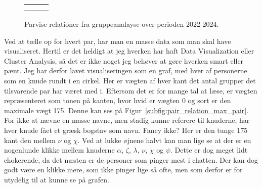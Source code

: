 \begin{article}
\begin{figure*}[t!]
	\centering
	\begin{tabularx}{2\columnwidth}{MMM}
		\resizebox{.60\columnwidth}{!}{}
		&
		\resizebox{.60\columnwidth}{!}{}
		&
		\resizebox{.60\columnwidth}{!}{}
		\\
		\label{subfig:pair_relation_max_pair}
		&
		\label{subfig:pair_relation_group_count}
		&
		\label{subfig:pair_relation_max_group_count}
	\end{tabularx}
	\vspace{-20pt}
	\caption{Parvise relationer fra gruppeanalayse over perioden 2022-2024.}
	\label{fig:pair_relation}
\end{figure*}

Ved at tælle op for hvert par, har man en masse data som man skal have visualiseret. Hertil er det heldigt at jeg hverken har haft Data Visualization eller Cluster Analysis, så det er ikke noget jeg behøver at gøre hverken smart eller pænt. Jeg har derfor lavet visualiseringen som en graf, med hver af personerne som en knude rundt i en cirkel. Her er vægten af hver kant det antal grupper det tilsvarende par har været med i. Eftersom det er for mange tal at læse, er vægten repræsenteret som tonen på kanten, hvor hvid er vægten 0 og sort er den maximale vægt 175.
Denne kan ses på Figur~\ref{subfig:pair_relation_max_pair}. For ikke at nævne en masse navne, men stadig kunne referere til knuderne, har hver knude fået et græsk bogstav som navn. Fancy ikke?
Her er den tunge 175 kant den mellem $\nu$ og $\chi$. Ved at lukke øjnene halvt kan man lige se at der er en nogenlunde klikke mellem knuderne $\alpha$, $\zeta$, $\lambda$, $\nu$, $\chi$ og $\psi$. Dette er dog meget lidt chokerende, da det næsten er de personer som pinger mest i chatten. Der kan dog godt være en klikke mere, som ikke pinger lige så ofte, men som derfor er for utydelig til at kunne se på grafen.


\end{article}
